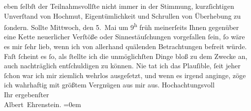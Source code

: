 \begin{ledgroupsized}[t]{13cm}
                    eben ſelbſt der Teilnahmsvollſte nicht immer in der Stimmung, kurzſichtigen
                    Unverſtand von Hochmut, Eigentümlichkeit und Schrullen von Überhebung zu
                    ſondern. Sollte Mittwoch, den 5. Mai um 9\textsuperscript{h} früh meinerſeits Ihnen gegenüber eine
                    Kette neuerlicher Verſtöße oder Sinnestäuſchungen vorgefallen ſein, ſo wäre es
                    mir ſehr lieb, wenn ich von allerhand quälenden Betrachtungen befreit würde.
                    Faſt ſcheint es ſo, als ſtellte ich die unmöglichſten Dinge bloß zu dem Zwecke
                    an, auch nachträglich entſchuldigen zu können. Nie tat ich das Plauſible, ſeit
                    jeher ſchon war ich mir ziemlich wehrlos ausgeſetzt, und wenn es irgend anginge,
                    zöge ich {\pb}wahrhaftig mit größtem Vergnügen aus mir
                    aus.\pend
           \pstart
           Hochachtungsvoll{\\[\baselineskip]}Ihr ergebenſter{\\[\baselineskip]}\spacefill\mbox{Albert Ehrenstein.}\pend
           \leftskip=0em{}
         
         \endnumbering{}\end{ledgroupsized}  \newcommand{\dateiname}{L01840}\newcommand{\titel}{Albert Ehrenstein an Arthur Schnitzler, 6. 5. 1909}\newcommand{\editorInnen}{Martin Anton Müller und Gerd-Hermann Susen}
      